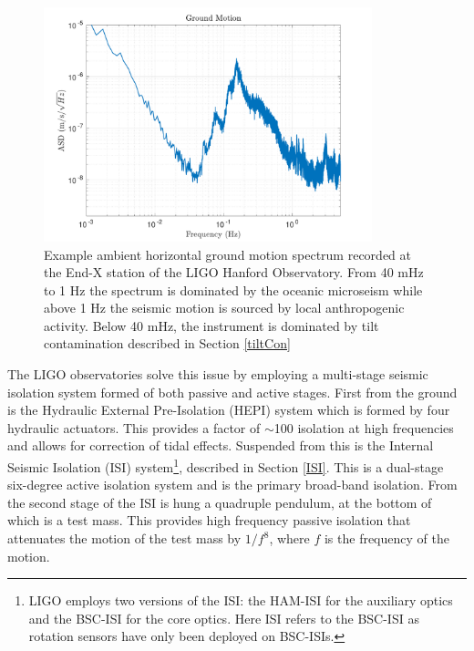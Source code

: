 \documentclass [12pt, proquest]{uwthesis}[2019]
\begin{document}
\begin{figure}[!h]
\begin{center}
\includegraphics[width=0.85\textwidth]{GroundSpectrum.pdf}
\caption[Example ambient ground motion spectrum]{Example ambient horizontal ground motion spectrum recorded at the End-X station of the LIGO Hanford Observatory. From 40 mHz to 1 Hz the spectrum is dominated by the oceanic microseism while above 1 Hz the seismic motion is sourced by local anthropogenic activity. Below 40 mHz, the instrument is dominated by tilt contamination described in Section \ref{tiltCon}}
\label{groundSpec}
\end{center}
\end{figure}

The LIGO observatories solve this issue by employing a multi-stage seismic isolation system formed of both passive and active stages. \cite{ligoSeis} First from the ground is the Hydraulic External Pre-Isolation (HEPI) system which is formed by four hydraulic actuators. This provides a factor of $\sim$100 isolation at high frequencies and allows for correction of tidal effects. Suspended from this is the Internal Seismic Isolation (ISI) system\footnote{LIGO employs two versions of the ISI: the HAM-ISI for the auxiliary optics and the BSC-ISI for the core optics. Here ISI refers to the BSC-ISI as rotation sensors have only been deployed on BSC-ISIs.}, described in Section \ref{ISI}. This is a dual-stage six-degree active isolation system and is the primary broad-band isolation. From the second stage of the ISI is hung a quadruple pendulum, at the bottom of which is a test mass. This provides high frequency passive isolation that attenuates the motion of the test mass by $1/f^8$, where $f$ is the frequency of the motion.
\end{document}
